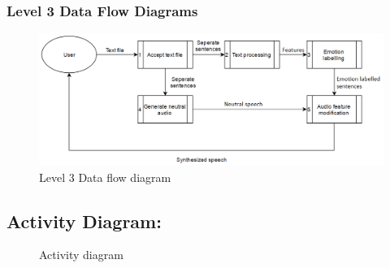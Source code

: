 \documentclass[oneside,a4paper,12pt]{book}
\begin{document}
\subsubsection{Level 3 Data Flow Diagrams}
\begin{center}
	\begin{figure}[!htbp]
		\centering
		\includegraphics[scale=0.40]{data_flow.png}
		\caption{Level 3 Data flow diagram}
		\label{fig:dfd-dig}
	\end{figure}
\end{center}


\newpage
\subsection{Activity Diagram:}
\begin{center}
	\begin{figure}[!htbp]
		\centering
		\caption{Activity diagram}
		\label{fig:act-dig}
	\end{figure}
\end{center} 
\end{document}
